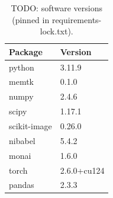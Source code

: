 \begin{table}
\centering
\small
\begin{tabular}{ll}
\toprule
Package & Version \\
\midrule
python & 3.11.9 \\
memtk & 0.1.0 \\
numpy & 2.4.6 \\
scipy & 1.17.1 \\
scikit-image & 0.26.0 \\
nibabel & 5.4.2 \\
monai & 1.6.0 \\
torch & 2.6.0+cu124 \\
pandas & 2.3.3 \\
\bottomrule
\end{tabular}
\caption{TODO: software versions (pinned in requirements-lock.txt).}
\label{tab:software}
\end{table}
